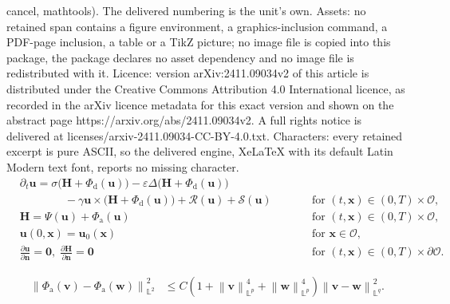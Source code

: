 \documentclass[10pt,a4paper]{amsart}
\newcommand{\bb}{\mathbb}
\newcommand{\bff}{\boldsymbol}
\newcommand{\norm}[2]{\left\|{#1}\right\|_{#2}}
\begin{document}
cancel, mathtools). The delivered numbering is the unit's own. Assets: no retained span contains a figure environment, a graphics-inclusion command, a PDF-page inclusion, a table or a TikZ picture; no image file is copied into this package, the package declares no asset dependency and no image file is redistributed with it. Licence: version arXiv:2411.09034v2 of this article is distributed under the Creative Commons Attribution 4.0 International licence, as recorded in the arXiv licence metadata for this exact version and shown on the abstract page https://arxiv.org/abs/2411.09034v2. A full rights notice is delivered at licenses/arxiv-2411.09034-CC-BY-4.0.txt. Characters: every retained excerpt is pure ASCII, so the delivered engine, XeLaTeX with its default Latin Modern text font, reports no missing character.
\begin{subequations}\label{equ:llbar}
	\begin{alignat}{2}
		&\partial_t \bff{u}
		= 
		\sigma \big(\bff{H}+\Phi_{\mathrm{d}}(\bff{u})\big)
		- \varepsilon \Delta \big(\bff{H}+\Phi_{\mathrm{d}}(\bff{u})\big) 
		&&
		\nonumber \\
		\label{equ:llbar a}
		&\qquad\qquad
		- \gamma \bff{u} \times \big(\bff{H}+\Phi_{\mathrm{d}}(\bff{u})\big)
		+ \mathcal{R}(\bff{u})
		+ \mathcal{S}(\bff{u})
		&&\qquad  \text{for $(t,\bff{x})\in(0,T)\times\mathscr{O}$,}
		\\[1ex]
		\label{equ:llbar b}
		&\bff{H}
		= 
		\Psi(\bff{u})
		+ \Phi_{\mathrm{a}}(\bff{u})
		&&\qquad \text{for $(t,\bff{x})\in(0,T)\times\mathscr{O}$,}
		\\[1ex]
		\label{equ:llbar c}
		&\bff{u}(0,\bff{x})= \bff{u}_0(\bff{x}) 
		&&\qquad \text{for } \bff{x}\in \mathscr{O},
		\\[1ex]
		\label{equ:llbar d}
		&\displaystyle{
			\frac{\partial \bff{u}}{\partial \bff{n}}= \bff{0}}, 
		\;\displaystyle{\frac{\partial \bff{H}}{\partial \bff{n}}= \bff{0}} 
		&&\qquad \text{for } (t,\bff{x})\in (0,T) \times \partial \mathscr{O}.
	\end{alignat}
\end{subequations}

\begin{align}
    \label{equ:Phi av aw norm}
    \norm{\Phi_{\mathrm{a}}(\bff{v})-\Phi_{\mathrm{a}}(\bff{w})}{\bb{L}^2}^2
    &\leq
    C \left(1+\norm{\bff{v}}{\bb{L}^p}^4+ \norm{\bff{w}}{\bb{L}^p}^4\right) \norm{\bff{v}-\bff{w}}{\bb{L}^q}^2.
\end{align}
\end{document}

